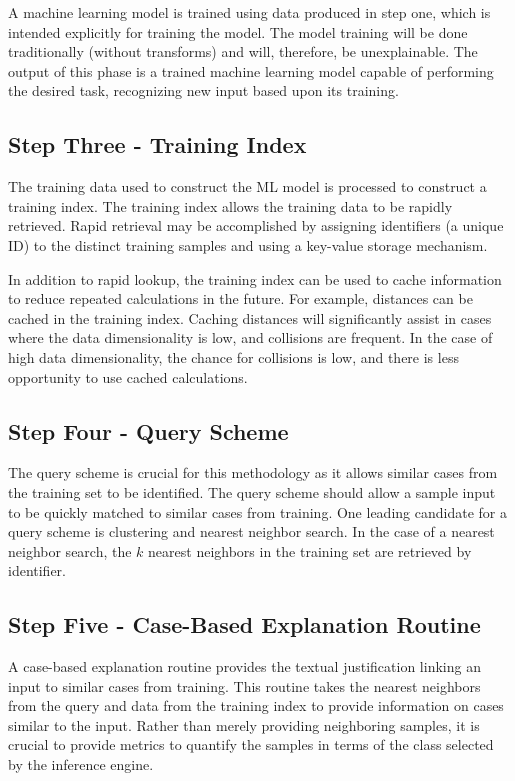 A machine learning model is trained using data produced in step one, which is
intended explicitly for training the model. The model training will be done
traditionally (without transforms) and will, therefore, be unexplainable. The
output of this phase is a trained machine learning model capable of performing
the desired task, recognizing new input based upon its training.

\subsection{Step Three - Training Index}

The training data used to construct the ML model is processed to construct a
training index. The training index allows the training data to be rapidly
retrieved. Rapid retrieval may be accomplished by assigning identifiers (a
unique ID) to the distinct training samples and using a key-value storage
mechanism.

In addition to rapid lookup, the training index can be used to cache information
to reduce repeated calculations in the future. For example, distances can be
cached in the training index. Caching distances will significantly assist in
cases where the data dimensionality is low, and collisions are frequent. In the
case of high data dimensionality, the chance for collisions is low, and there is
less opportunity to use cached calculations.

\subsection{Step Four - Query Scheme} %

The query scheme is crucial for this methodology as it allows similar cases from
the training set to be identified. The query scheme should allow a sample input
to be quickly matched to similar cases from training. One leading candidate for
a query scheme is clustering and nearest neighbor search. In the case of a
nearest neighbor search, the $k$ nearest neighbors in the training set are
retrieved by identifier.

\subsection{Step Five - Case-Based Explanation Routine}

A case-based explanation routine provides the textual justification linking an
input to similar cases from training. This routine takes the nearest neighbors
from the query and data from the training index to provide information on cases
similar to the input. Rather than merely providing neighboring samples, it is
crucial to provide metrics to quantify the samples in terms of the class
selected by the inference engine.

